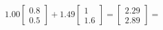 \documentclass[preview]{standalone}
\begin{document}
\begin{align*}
1.00 \begin{bmatrix} 0.8 \\ 0.5 \end{bmatrix} + 1.49 \begin{bmatrix} 1 \\ 1.6 \end{bmatrix} = \begin{bmatrix} 2.29 \\ 2.89 \end{bmatrix} =
\end{align*}
\end{document}
